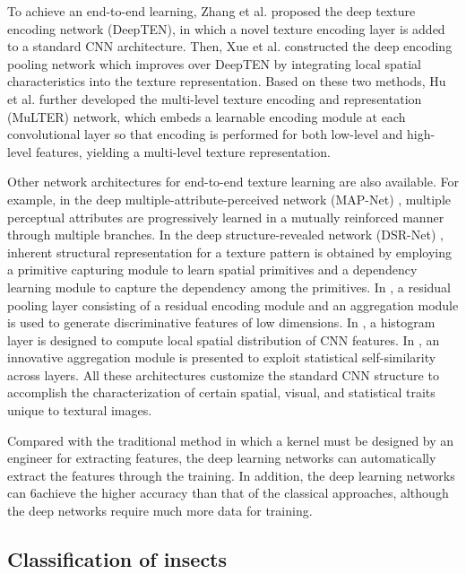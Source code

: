 \documentclass{aci}
\numberwithin{equation}{section}
\begin{document}
To achieve an end-to-end learning, Zhang et al. \cite{zhang_deep_2017} proposed
the deep texture encoding network (DeepTEN), in which a novel texture encoding
layer is added to a standard CNN architecture. Then, Xue et al.
\cite{xue_deep_2018} constructed the deep encoding pooling network which
improves over DeepTEN by integrating local spatial characteristics into the
texture representation. Based on these two methods, Hu et al. \cite{hu_multi_2019}
further developed the multi-level texture encoding and representation (MuLTER)
network, which embeds a learnable encoding module at each convolutional layer so
that encoding is performed for both low-level and high-level features, yielding
a multi-level texture representation.

Other network architectures for end-to-end texture learning are also available.
For example, in the deep multiple-attribute-perceived network (MAP-Net)
\cite{zhai_deep_2019}, multiple perceptual attributes are progressively learned
in a mutually reinforced manner through multiple branches. In the deep
structure-revealed network (DSR-Net) \cite{zhai_deep_2020}, inherent structural
representation for a texture pattern is obtained by employing a primitive
capturing module to learn spatial primitives and a dependency learning module to
capture the dependency among the primitives. In \cite{mao_deep_2021}, a residual
pooling layer consisting of a residual encoding module and an aggregation module
is used to generate discriminative features of low dimensions. In
\cite{peeples_histogram_2021}, a histogram layer is designed to compute local
spatial distribution of CNN features. In \cite{chen_deep_2021}, an innovative
aggregation module is presented to exploit statistical self-similarity across
layers. All these architectures customize the standard CNN structure to
accomplish the characterization of certain spatial, visual, and statistical
traits unique to textural images.

Compared with the traditional method in which a kernel must be designed by an
engineer for extracting features, the deep learning networks can automatically
extract the features through the training. In addition, the deep learning
networks can 6achieve the higher accuracy than that of the classical approaches,
although the deep networks require much more data for training.

\subsection{Classification of insects}
\end{document}
